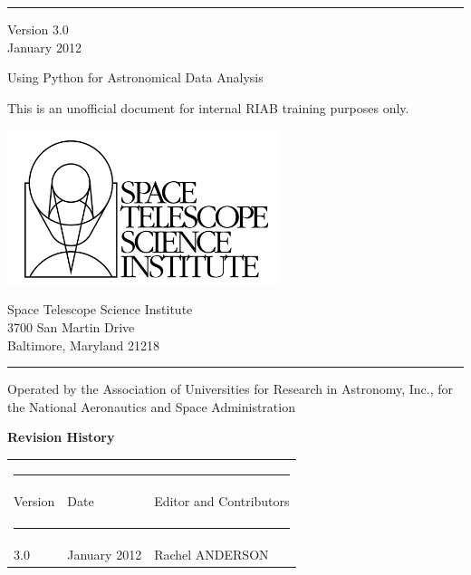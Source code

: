 \begin{titlepage}
\rule{165mm}{0.8mm}
 Version 3.0 \\
 January 2012

\vspace{30mm}
{\Huge Using Python for Astronomical Data Analysis }

\vspace{10mm}
{\large This is an unofficial document for internal RIAB training purposes only.}
\vspace{65mm}

\begin{minipage}[l]{80mm}
\includegraphics[width=8cm]{logo.jpg}

\end{minipage}
%
\hspace{5mm}
\begin{minipage}[u]{75mm}
\begin{flushright}
Space Telescope Science Institute \\
3700 San Martin Drive \\
Baltimore, Maryland 21218
\end{flushright}
\end{minipage}

\rule{165mm}{0.8mm}

{\scriptsize Operated by the Association of Universities for Research in Astronomy, Inc., for the National Aeronautics and Space Administration }
 
 \newpage
  \thispagestyle{empty}  
  
{\Large \bf Revision History}



\begin{table}[h]
\begin{tabular}{lll} 
\multicolumn{3}{c}{ \rule{130mm}{0.2mm}}      \\
Version  & Date & Editor and Contributors    {\rule [-3mm]{0mm}{8mm}  }\\ 
 \multicolumn{3}{c}{ \rule[2mm]{130mm}{0.8mm}}      \\
      3.0                 &  January 2012  & Rachel ANDERSON  \\ 
 

\end{tabular}
\end{table}
\end{titlepage}
